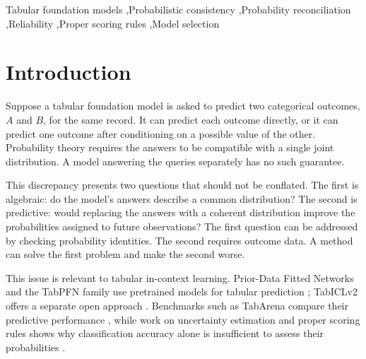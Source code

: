 \documentclass[a4paper,fleqn]{cas-sc}
\begin{document}
\begin{keywords}
Tabular foundation models \sep Probabilistic consistency \sep Probability reconciliation \sep Reliability \sep Proper scoring rules \sep Model selection
\end{keywords}

\maketitle

\section{Introduction}
Suppose a tabular foundation model is asked to predict two categorical outcomes, $A$ and $B$, for the same record. It can predict each outcome directly, or it can predict one outcome after conditioning on a possible value of the other. Probability theory requires the answers to be compatible with a single joint distribution. A model answering the queries separately has no such guarantee.

This discrepancy presents two questions that should not be conflated. The first is algebraic: do the model's answers describe a common distribution? The second is predictive: would replacing the answers with a coherent distribution improve the probabilities assigned to future observations? The first question can be addressed by checking probability identities. The second requires outcome data. A method can solve the first problem and make the second worse.

This issue is relevant to tabular in-context learning. Prior-Data Fitted Networks and the TabPFN family use pretrained models for tabular prediction \citep{muller2022pfns,hollmann2023tabpfn,hollmann2025tabpfn,grinsztajn2025tabpfn25,grinsztajn2026tabpfn3}; TabICLv2 offers a separate open approach \citep{qu2026tabiclv2}. Benchmarks such as TabArena compare their predictive performance \citep{erickson2025tabarena}, while work on uncertainty estimation and proper scoring rules shows why classification accuracy alone is insufficient to assess their probabilities \citep{landsgesell2026scoringbench,johnson2026uq,costa2026lowreliability,tanna2026ensembling}.
\end{document}
